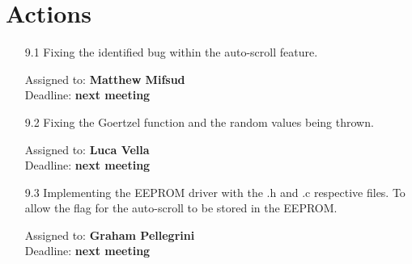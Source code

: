 \documentclass{cce2014-meetings}
\begin{document}
\section*{Actions}

\begin{enumerate}

   \item [9.1] Fixing the identified bug within the auto-scroll feature.
         \begin{flushright}
            Assigned to: \textbf{Matthew Mifsud} \\
            Deadline: \textbf{next meeting}
         \end{flushright}

   \item [9.2] Fixing the Goertzel function and the random values being thrown.
         \begin{flushright}
            Assigned to: \textbf{Luca Vella} \\
            Deadline: \textbf{next meeting}
         \end{flushright}

   \item [9.3] Implementing the EEPROM driver with the .h and .c respective files. To allow the flag for the auto-scroll to be stored in the EEPROM.
         \begin{flushright}
            Assigned to: \textbf{Graham Pellegrini} \\
            Deadline: \textbf{next meeting}
         \end{flushright}

\end{enumerate}
\end{document}
